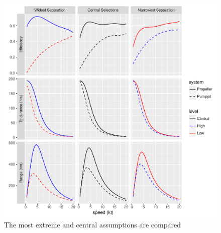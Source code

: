 \documentclass{article}\usepackage[]{graphicx}\usepackage[]{color}
\makeatletter
\def\maxwidth{ %
  \ifdim\Gin@nat@width>\linewidth
    \linewidth
  \else
    \Gin@nat@width
  \fi
}
\newenvironment{knitrout}{}{} %
\makeatother
\begin{document}
\begin{figure}
\begin{knitrout}
\color{fgcolor}

{\centering \includegraphics[width=\maxwidth]{figures/plots-plot_results1-1} 

}



\end{knitrout}
\caption{The most extreme and central assumptions are compared}
\label{fig:central_extreme}
\end{figure}
\end{document}
